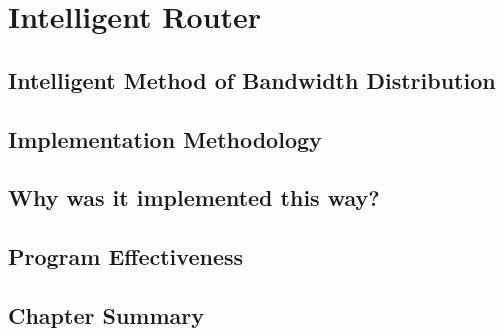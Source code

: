 \chapter{Intelligent Router}
\label{chapter4}


\section{Intelligent Method of Bandwidth Distribution}

\section{Implementation Methodology}


\section{Why was it implemented this way?}

\section{Program Effectiveness}


\section {Chapter Summary}


